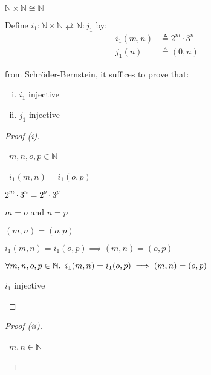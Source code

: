 \newcommand{\Nat}{\mathbb{N}}
\begin{prop}
  $\Nat\times\Nat\cong\Nat$

  Define $i_1 : \Nat\times\Nat\rightleftarrows\Nat : j_1$ by:
  \begin{align*}
    i_1(m, n) & \triangleq 2^m\cdot3^n\\
    j_1(n) & \triangleq (0, n)
  \end{align*}

  from Schr\"oder-Bernstein, it suffices to prove that:
  \begin{enumerate}[(i)]
    \item $i_1$ injective
    \item $j_1$ injective
  \end{enumerate}

  \begin{proof}[Proof (i)]~\\
    \begin{itemize}
      \step
        \begin{itemize}
          \subp{\star}
            \Let~$m,n,o,p\in\Nat$
            \marginnote{\Hyp}

          \step
            \begin{itemize}
              \subp{\dagger}
                \Ass~$i_1(m,n) = i_1(o,p)$
                \marginnote{\Hyp}

              \step[\iffs]
                $2^m\cdot3^n = 2^o\cdot3^p$

              \step[\iffs] $m = o$ and $n = p$

              \step[\iffs] $(m, n) = (o, p)$
            \end{itemize}
            \step[\imps]
              $i_1(m,n) = i_1(o,p) \implies (m,n) = (o,p)$
              \marginnote{$\imps$-\Intro}
        \end{itemize}

        \step[\imps]
          $\forall m,n,o,p\in\Nat\ldotp~i_1(m,n) = i_1(o,p) \implies (m,n) = (o,p)$
          \marginnote{$\forall$-\Intro}

        \step[\iffs]
          $i_1$ injective
          \qedhere
    \end{itemize}
  \end{proof}

  \begin{proof}[Proof (ii)]~\\
    \begin{itemize}
      \step
        \begin{itemize}
          \subp{\star}
            \Let~$m,n\in\Nat$
            \marginnote{\Hyp}


\end{itemize}
\end{itemize}
\end{proof}
\end{prop}
